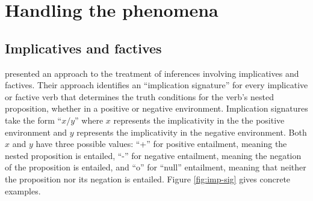 \section{Handling the phenomena}

\subsection*{Implicatives and factives}

\citet{nairn:icos2006} presented an approach to the treatment of inferences
involving implicatives and factives.  Their approach identifies an ``implication
signature'' for every implicative or factive verb that determines the truth
conditions for the verb's nested proposition, whether in a positive or negative
environment.  Implication signatures take the form ``$x/y$'' where $x$
represents the implicativity in the the positive environment and $y$ represents
the implicativity in the negative environment.  Both $x$ and $y$ have three
possible values: ``+'' for positive entailment, meaning the nested proposition
is entailed, ``-'' for negative entailment, meaning the negation of the proposition
is entailed, and ``o'' for ``null'' entailment, meaning that neither the
proposition nor its negation is entailed. Figure \ref{fig:imp-sig} gives
concrete examples.%


